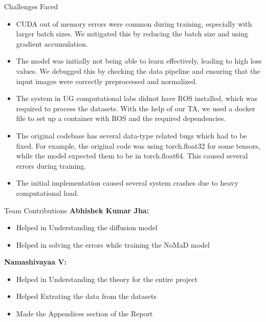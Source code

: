 \documentclass{beamer}
\begin{document}
\begin{frame}{Challenges Faced}
    \begin{itemize}
        \item CUDA out of memory errors were common during training, especially with larger batch sizes. We mitigated this by reducing the batch size and using gradient accumulation.
        \item The model was initially not being able to learn effectively, leading to high loss values. We debugged this by checking the data pipeline and ensuring that the input images were correctly preprocessed and normalized.
        \item The system in UG computational labs didnot have ROS installed, which was required to process the datasets. With the help of our TA, we used a docker file to set up a container with ROS and the required dependencies.
        \item The original codebase has several data-type related bugs which had to be fixed. For example, the original code was using torch.float32 for some tensors, while the model expected them to be in torch.float64. This caused several errors during training.
        \item The initial implementation caused several system crashes due to heavy computational load.
    \end{itemize}
\end{frame}

\begin{frame}{Team Contributions}
    \textbf{Abhishek Kumar Jha:} \\
    \begin{itemize}
        \item Helped in Understanding the diffusion model
        \item Helped in solving the errors while training the NoMaD model
    \end{itemize}
    \textbf{Namashivayaa V:} \\
    \begin{itemize}
        \item Helped in Understanding the theory for the entire project
        \item Helped Extrating the data from the datasets
        \item Made the Appendices section of the Report
    \end{itemize}
\end{frame}

\newpage
\end{document}
